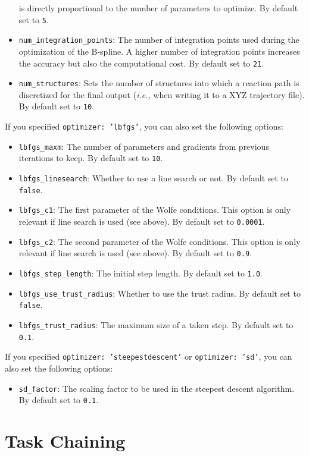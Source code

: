 \documentclass[]{tufte-book}
\begin{document}
\begin{itemize}
is directly proportional to the number of parameters to optimize. By default set to \texttt{5}.
\item \texttt{num\_integration\_points}: The number of integration points used during the optimization of the B-spline.
A higher number of integration points increases the accuracy but also the computational cost. By default set to \texttt{21}.
\item \texttt{num\_structures}: Sets the number of structures into which a reaction path is discretized for the final
output (\textit{i.e.,} when writing it to a XYZ trajectory file). By default set to \texttt{10}.
\end{itemize}

If you specified \texttt{optimizer: 'lbfgs'}, you can also set the following options:
\begin{itemize}
\item \texttt{lbfgs\_maxm}: The number of parameters and gradients from previous iterations to keep. By default set to 
\texttt{10}.
\item \texttt{lbfgs\_linesearch}: Whether to use a line search or not. By default set to \texttt{false}.
\item \texttt{lbfgs\_c1}: The first parameter of the Wolfe conditions. This option is only relevant if line search is
used (see above). By default set to \texttt{0.0001}.
\item \texttt{lbfgs\_c2}:  The second parameter of the Wolfe conditions. This option is only relevant if line search is
used (see above). By default set to \texttt{0.9}.
\item \texttt{lbfgs\_step\_length}: The initial step length. By default set to \texttt{1.0}.
\item \texttt{lbfgs\_use\_trust\_radius}: Whether to use the trust radius. By default set to \texttt{false}.
\item \texttt{lbfgs\_trust\_radius}: The maximum size of a taken step. By default set to \texttt{0.1}.
\end{itemize}

If you specified \texttt{optimizer: 'steepestdescent'} or \texttt{optimizer: 'sd'}, you can also set the following options:
\begin{itemize}
\item \texttt{sd\_factor}: The scaling factor to be used in the steepest descent algorithm. By default set to \texttt{0.1}.
\end{itemize}


\section{Task Chaining}
\label{sec:task_chaining}
\end{document}
